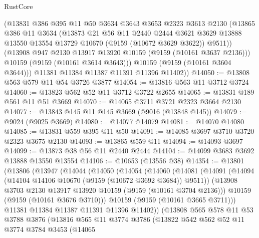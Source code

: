 \begin{lexlean}{RustCore}
\begin{coremodule}
          (@13831
            @386
            @395
            @11
            @50
            @3634
            @3643
            @3653
            @2323
            @3613
            @2130
            (@13865
              @386
              @11
              @3634
              (@13873
                @21
                @56
                @11
                @2440
                @2444
                @3621
                @3629
                @13888
                @13550
                @13554
                @13729
                @10670
                (@9159 (@10672 @3629 @3622))
                @9511))
            (@13908 @947 @2130 @13917 @13920 @10159 (@9159 (@10161 @3637 @2136)))
            @10159
            (@9159 (@10161 @3614 @3643)))
          @10159
          (@9159 (@10161 @3604 @3644)))
        @11381
        @11384
        @11387
        @11391
        @11396
        @11402))
@14050 := @13808 @563 @579 @11 @54 @3726 @3877
@14054 := @13816 @563 @11 @3712 @3724
@14060 := @13823 @562 @52 @11 @3712 @3722 @2655
@14065 := @13831 @189 @561 @11 @51 @3669
@14070 := @14065 @3711 @3721 @2323 @3664 @2130
@14077 := @13843 @145 @11 @145 @3669 (@9016 (@13848 @145))
@14079 := @9024 (@9025 @3669)
@14080 := @14077 @14079
@14081 := @14070 @14080
@14085 := @13831 @559 @395 @11 @50
@14091 := @14085 @3697 @3710 @3720 @2323 @3675 @2130
@14093 := @13865 @559 @11
@14094 := @14093 @3697
@14099 := @13873 @38 @56 @11 @2440 @2444
@14104 := @14099 @3683 @3692 @13888 @13550 @13554
@14106 := @10653 (@13556 @38)
@14354 := @13801
    (@13806
      (@13947
        (@14044
          (@14050
            (@14054
              (@14060
                (@14081
                  (@14091
                    (@14094 (@14104 @14106 @10670 (@9159 (@10672 @3692 @3684)) @9511))
                    (@13908 @3703 @2130 @13917 @13920 @10159 (@9159 (@10161 @3704 @2136)))
                    @10159
                    (@9159 (@10161 @3676 @3710)))
                  @10159
                  (@9159 (@10161 @3665 @3711)))
                @11381
                @11384
                @11387
                @11391
                @11396
                @11402))
            (@13808
              @565
              @578
              @11
              @53
              @3788
              @3876
              (@13816
                @565
                @11
                @3774
                @3786
                (@13822
                  @542
                  @562
                  @52
                  @11
                  @3774
                  @3784
                  @3453
                  (@14065

\end{coremodule}
\end{lexlean}
